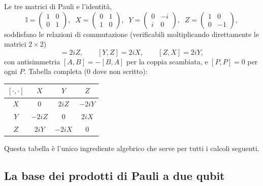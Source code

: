 \documentclass[11pt,a4paper]{article}
\begin{document}
Le tre matrici di Pauli e l'identità,
\begin{equation}
\mathbb I=\begin{pmatrix}1&0\\0&1\end{pmatrix},\;\;
X=\begin{pmatrix}0&1\\1&0\end{pmatrix},\;\;
Y=\begin{pmatrix}0&-i\\i&0\end{pmatrix},\;\;
Z=\begin{pmatrix}1&0\\0&-1\end{pmatrix},
\end{equation}
soddisfano le relazioni di commutazione (verificabili moltiplicando direttamente le matrici
$2\times2$)
\begin{equation}
[X,Y]=2iZ,\qquad [Y,Z]=2iX,\qquad [Z,X]=2iY,
\label{eq:paulicomm}
\end{equation}
con antisimmetria $[A,B]=-[B,A]$ per la coppia scambiata, e $[P,P]=0$ per ogni $P$. Tabella
completa (0 dove non scritto):
\begin{center}
\begin{tabular}{c|ccc}
$[\cdot,\cdot]$ & $X$ & $Y$ & $Z$\\\hline
$X$ & $0$ & $2iZ$ & $-2iY$\\
$Y$ & $-2iZ$ & $0$ & $2iX$\\
$Z$ & $2iY$ & $-2iX$ & $0$
\end{tabular}
\end{center}
Questa tabella è l'unico ingrediente algebrico che serve per tutti i calcoli seguenti.

\subsection{La base dei prodotti di Pauli a due qubit}
\end{document}
